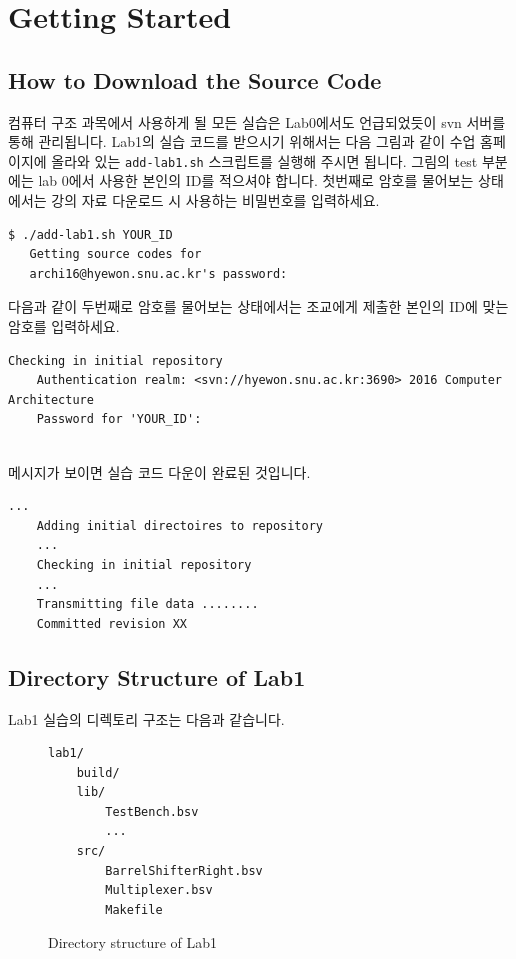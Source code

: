 \documentclass{article}
\begin{document}
\section{Getting Started}
\subsection{How to Download the Source Code}
컴퓨터 구조 과목에서 사용하게 될 모든 실습은 Lab0에서도 언급되었듯이 svn 서버를 통해 관리됩니다.
Lab1의 실습 코드를 받으시기 위해서는 다음 그림과 같이 수업 홈페이지에 올라와 있는 \texttt{add-lab1.sh} 스크립트를
실행해 주시면 됩니다. 그림의 test 부분에는 lab 0에서 사용한 본인의 ID를 적으셔야 합니다.
첫번째로 암호를 물어보는 상태에서는 강의 자료 다운로드 시 사용하는 비밀번호를 입력하세요.

\begin{Verbatim}[frame=single]
   $ ./add-lab1.sh YOUR_ID
   Getting source codes for
   archi16@hyewon.snu.ac.kr's password:
\end{Verbatim}

\noindent 다음과 같이 두번째로 암호를 물어보는 상태에서는 조교에게 제출한 본인의 ID에 맞는 암호를 입력하세요.


\begin{Verbatim}[frame=single]
    Checking in initial repository
    Authentication realm: <svn://hyewon.snu.ac.kr:3690> 2016 Computer Architecture
    Password for 'YOUR_ID':
\end{Verbatim}

\ \\  메시지가 보이면 실습 코드 다운이 완료된 것입니다.
\begin{Verbatim}[frame=single]
    ...
    Adding initial directoires to repository
    ...
    Checking in initial repository
    ...
    Transmitting file data ........
    Committed revision XX
\end{Verbatim}

\subsection{Directory Structure of Lab1}
Lab1 실습의 디렉토리 구조는 다음과 같습니다.

\begin{figure}[!h]
\begin{verbatim}
lab1/
    build/
    lib/
        TestBench.bsv
        ...
    src/
        BarrelShifterRight.bsv
        Multiplexer.bsv
        Makefile
\end{verbatim}
\caption{Directory structure of Lab1}
\label{fig:files}
\end{figure}
\end{document}
